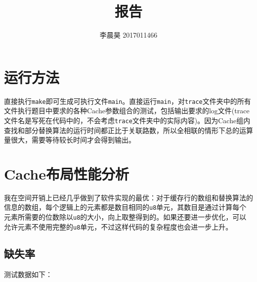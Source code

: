 \documentclass[12pt, UTF8]{article}
\title{报告}
\author{李晨昊 2017011466}
\begin{document}
\maketitle
\tableofcontents

\section{运行方法}

直接执行\lstinline|make|即可生成可执行文件\lstinline|main|。直接运行\lstinline|main|，对\lstinline|trace|文件夹中的所有文件执行题目中要求的各种Cache参数组合的测试，包括输出要求的log文件(trace文件名是写死在代码中的，不会考虑\lstinline|trace|文件夹中的实际内容)。因为Cache组内查找和部分替换算法的运行时间都正比于关联路数，所以全相联的情形下总的运算量很大，需要等待较长时间才会得到输出。

\section{Cache布局性能分析}

我在空间开销上已经几乎做到了软件实现的最优：对于缓存行的数组和替换算法的信息的数组，每个逻辑上的元素都是数目相同的\lstinline|u8|单元，其数目是通过计算每个元素所需要的位数除以\lstinline|u8|的大小，向上取整得到的。如果还要进一步优化，可以允许元素不使用完整的\lstinline|u8|单元，不过这样代码的复杂程度也会进一步上升。

\subsection{缺失率}

测试数据如下：
\end{document}
